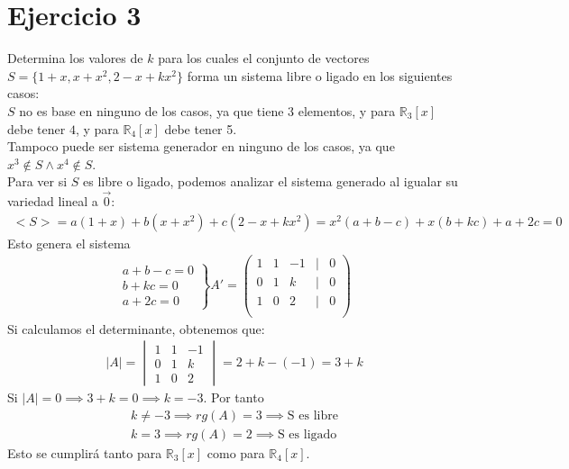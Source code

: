 \documentclass{article}
\begin{document}
\section{Ejercicio 3}
Determina los valores de $k$ para los cuales el conjunto de vectores $S = \{1 + x, x + x^{2} , 2 - x + kx^{2}\}$
forma un sistema libre o ligado en los siguientes casos:\\
$S$ no es base en ninguno de los casos, ya que tiene $3$ elementos, y para $\mathbb{R}_{3}[x]$ debe tener $4$, y
para $\mathbb{R}_{4}[x]$ debe tener 5.\\
Tampoco puede ser sistema generador en ninguno de los casos, ya que $x^{3} \not \in S \wedge x^{4} \not \in S$.\\
Para ver si $S$ es libre o ligado, podemos analizar el sistema generado al igualar su variedad lineal a $\vec{0}$:
\begin{equation}
    \begin{split}
        <S> = a(1+x) +b(x+x^{2}) +c(2-x+kx^{2}) = x^{2}(a+b-c) +x(b+kc) +a+2c = 0
    \end{split}
\end{equation}
Esto genera el sistema
\begin{equation}
    \begin{split}
        \left.\begin{matrix}
            a+b-c=0 \\
            b+kc=0 \\
            a+2c=0
            \end{matrix}\right\}A' = \begin{pmatrix}
            1 & 1 & -1 & | & 0 \\
            0 & 1 & k & | & 0 \\
            1 & 0 & 2 & | & 0 \\
            \end{pmatrix}
    \end{split}
\end{equation}
Si calculamos el determinante, obtenemos que:
\begin{equation}
    \begin{split}
        |A| = \begin{vmatrix}
            1 & 1 & -1\\
            0 & 1 & k\\
            1 & 0 & 2
        \end{vmatrix} =2+k -(-1)=3+k
    \end{split}
\end{equation}
Si $|A|=0 \implies 3+k =0 \implies k = -3$. Por tanto
\begin{equation}
    \begin{split}
        k \neq -3 \implies rg(A) = 3 \implies \text{S es libre}\\
        k = 3 \implies rg(A) = 2 \implies \text{S es ligado}
    \end{split}
\end{equation}
Esto se cumplirá tanto para $\mathbb{R}_{3}[x]$ como para $\mathbb{R}_{4}[x]$.
\end{document}

